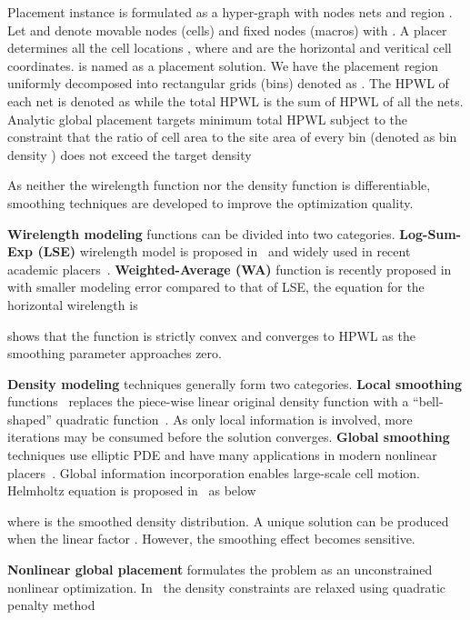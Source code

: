\documentclass[conference,10pt]{IEEEtran}
\begin{document}
Placement instance is formulated 
as a hyper-graph  with 
nodes  nets  and region .
Let  and  denote 
movable nodes (cells) and 
fixed nodes (macros) with .
A placer determines all the cell locations 
, 
where  and 
 are the 
horizontal and veritical cell coordinates.
 is named as a placement solution.
We have the placement region  uniformly 
decomposed into  
rectangular grids (bins) 
denoted as .
The HPWL of each net  is denoted as
 while the total HPWL  
is the sum of HPWL of all the nets.
{\footnotesize
}
Analytic global placement targets minimum total HPWL 
subject to the constraint that the ratio of cell area 
to the site area of every bin  
(denoted as bin density ) 
does not exceed 
the target density 

As neither the wirelength function  
nor the density function  is differentiable, 
smoothing techniques are 
developed to improve the optimization quality.

{\bf Wirelength modeling} functions 
can be divided into two categories.
{\bf Log-Sum-Exp (LSE)} 
wirelength model is proposed 
in~\cite{naylor} and widely used in recent academic 
placers~\cite{mpl6,ntupl3,aplace2}.
{\bf Weighted-Average (WA)} function is recently proposed 
in~\cite{wa} with smaller modeling error 
compared to that of LSE, the equation for the horizontal 
wirelength is 

\cite{wa} shows that 
the function 
is strictly convex and
converges to HPWL as 
the smoothing parameter  
approaches zero.


{\bf Density modeling} techniques
generally form two categories.
{\bf Local smoothing} 
functions~\cite{naylor} 
replaces the piece-wise linear original 
density function
with a ``bell-shaped'' quadratic function~\cite{ntupl3,aplace2}.
As only local information is involved,
more iterations may be consumed before the solution 
converges. 
{\bf Global smoothing} techniques 
use elliptic PDE and have many applications 
in modern nonlinear placers~\cite{mpl6}. 
Global information incorporation enables large-scale cell motion. 
Helmholtz equation is proposed in~\cite{mpl6} as below

where  is the smoothed density distribution. 
A unique solution can be produced when the linear factor .
However, the smoothing effect becomes sensitive.

{\bf Nonlinear global placement} formulates the 
problem as an unconstrained nonlinear optimization.
In~\cite{ntupl3,aplace2} 
the density constraints are relaxed 
using quadratic penalty method
\end{document}
